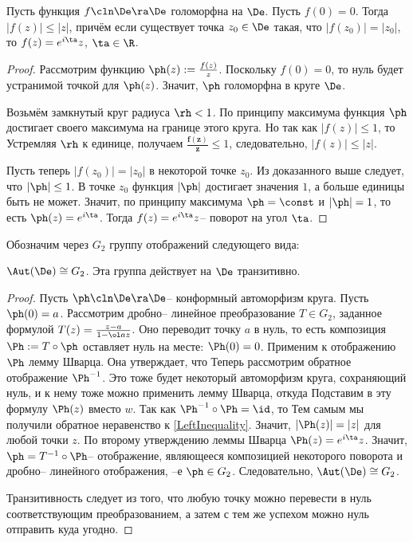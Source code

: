\documentclass[a4paper]{article}
\begin{document}
\begin{lemma}[Шварц]
Пусть функция $f\cln\De\ra\De$ голоморфна на $\De$. Пусть $f(0)=0$.
Тогда $|f(z)|\le |z|$, причём если существует точка $z_0\in\De$ такая, что $|f(z_0)|=|z_0|$,
то $f(z)=e^{i\ta}z$, $\ta\in\R$.
\end{lemma}
\begin{proof}
Рассмотрим функцию $\ph(z) := \frac{f(z)}{z}$. Поскольку $f(0)=0$, то нуль будет устранимой точкой для $\ph(z)$.
Значит, $\ph$ голоморфна в круге $\De$.

Возьмём замкнутый круг радиуса $\rh < 1$. По принципу максимума функция $\ph$ достигает своего максимума на
границе этого круга. Но так как $|f(z)| \le 1$, то
Устремляя $\rh$ к единице, получаем $\bm{\frac{f(z)}{z}} \le 1$, следовательно, $|f(z)|\le|z|$.

Пусть теперь $|f(z_0)|=|z_0|$ в некоторой точке $z_0$. Из доказанного выше следует, что $|\ph| \le 1$.
В точке $z_0$ функция $|\ph|$ достигает значения $1$, а больше единицы быть не может. Значит, по принципу максимума $\ph=\const$
и $|\ph|=1$, то есть $\ph(z) = e^{i\ta}$. Тогда $f(z) = e^{i\ta}z$-- поворот на угол $\ta$.
\end{proof}

Обозначим через $G_2$ группу отображений следующего вида:

\begin{theorem}
$\Aut(\De) \cong G_2$. Эта группа действует на $\De$ транзитивно.
\end{theorem}
\begin{proof}
Пусть $\ph\cln\De\ra\De$-- конформный автоморфизм круга. Пусть $\ph(0)=a$. Рассмотрим дробно-- линейное преобразование
$T\in G_2$, заданное формулой $T(z) = \frac{z-a}{1-\ol a z}$. Оно переводит точку $a$ в нуль, то есть
композиция $\Ph := T \circ \ph$ оставляет нуль на месте: $\Ph(0)=0$. Применим к отображению $\Ph$ лемму Шварца.
Она утверждает, что
Теперь рассмотрим обратное отображение $\Ph^{-1}$. Это тоже будет некоторый
автоморфизм круга, сохраняющий нуль, и к нему тоже можно применить лемму Шварца, откуда
Подставим в эту формулу $\Ph(z)$ вместо $w$. Так как $\Ph^{-1} \circ \Ph = \id$, то
Тем самым мы получили обратное неравенство к \eqref{LeftInequality}. Значит, $|\Ph(z)|=|z|$ для любой точки $z$.
По второму утверждению леммы Шварца $\Ph(z)=e^{i\ta}z$. Значит, $\ph = T^{-1}\circ \Ph$-- отображение, являющееся
композицией некоторого поворота и дробно-- линейного отображения, --е $\ph \in G_2$. Следовательно, $\Aut(\De) \cong G_2$.

Транзитивность следует из того, что любую точку можно перевести в нуль соответствующим преобразованием,
а затем с тем же успехом можно нуль отправить куда угодно.
\end{proof}
\end{document}
